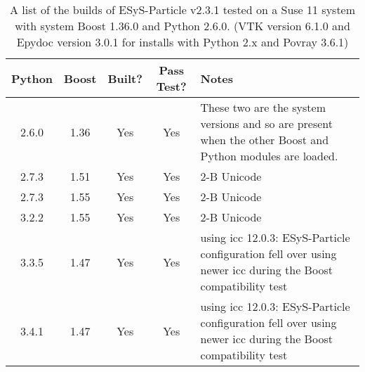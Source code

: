 \begin{table} [h]
    \centering
    \begin{tabular}{|c|c|c|c|p{8cm}|}
    \hline
    Python & Boost &  Built? & Pass Test? & Notes \\ \hline
    2.6.0  & 1.36  &  Yes    & Yes &    These two are the system versions and so are present when the other Boost and Python modules are loaded. \\
    2.7.3  & 1.51  &  Yes    & Yes &    2-B Unicode \\
    2.7.3  & 1.55  &  Yes    & Yes &    2-B Unicode \\
    3.2.2  & 1.55  &  Yes    & Yes &    2-B Unicode \\
    3.3.5  & 1.47  &  Yes    & Yes &    using icc 12.0.3: ESyS-Particle configuration fell over using newer icc during the Boost compatibility test \\
    3.4.1  & 1.47  &  Yes    & Yes &    using icc 12.0.3: ESyS-Particle configuration fell over using newer icc during the Boost compatibility test \\  \hline
    \end{tabular}
    \caption{A list of the builds of ESyS-Particle v2.3.1 tested on a Suse 11 system with system Boost 1.36.0 and Python 2.6.0. (VTK version 6.1.0 and Epydoc version 3.0.1 for installs with Python 2.x and Povray 3.6.1)}
\end{table}

